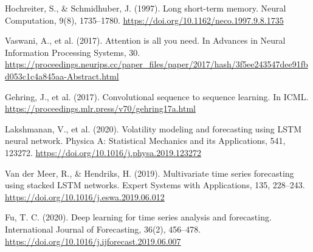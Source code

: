 \documentclass[conference]{IEEEtran}
\begin{document}
\begin{thebibliography}{99}
 Hochreiter, S., \& Schmidhuber, J. (1997). Long short-term memory. Neural Computation, 9(8), 1735–1780. \url{https://doi.org/10.1162/neco.1997.9.8.1735}

 Vaswani, A., et al. (2017). Attention is all you need. In Advances in Neural Information Processing Systems, 30. \url{https://proceedings.neurips.cc/paper_files/paper/2017/hash/3f5ee243547dee91fbd053c1c4a845aa-Abstract.html}

 Gehring, J., et al. (2017). Convolutional sequence to sequence learning. In ICML. \url{https://proceedings.mlr.press/v70/gehring17a.html}

 Lakshmanan, V., et al. (2020). Volatility modeling and forecasting using LSTM neural network. Physica A: Statistical Mechanics and its Applications, 541, 123272. \url{https://doi.org/10.1016/j.physa.2019.123272}

 Van der Meer, R., \& Hendriks, H. (2019). Multivariate time series forecasting using stacked LSTM networks. Expert Systems with Applications, 135, 228–243. \url{https://doi.org/10.1016/j.eswa.2019.06.012}

 Fu, T. C. (2020). Deep learning for time series analysis and forecasting. International Journal of Forecasting, 36(2), 456–478. \url{https://doi.org/10.1016/j.ijforecast.2019.06.007}

\end{thebibliography}
\end{document}
